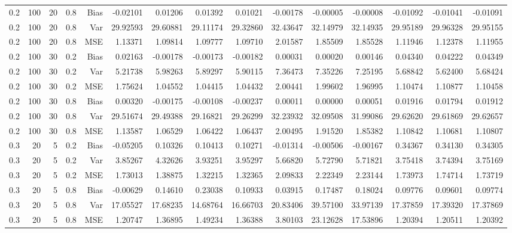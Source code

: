 \begin{table}[!htbp]
\begin{tabular}{lrrrrrrrrrrrrrr}
0.2 & 100 & 20 & 0.8 & Bias & -0.02101 & 0.01206 & 0.01392 & 0.01021 & -0.00178 & -0.00005 & -0.00008 & -0.01092 & -0.01041 & -0.01091 \\
0.2 & 100 & 20 & 0.8 & Var & 29.92593 & 29.60881 & 29.11174 & 29.32860 & 32.43647 & 32.14979 & 32.14935 & 29.95189 & 29.96328 & 29.95155 \\
0.2 & 100 & 20 & 0.8 & MSE & 1.13371 & 1.09814 & 1.09777 & 1.09710 & 2.01587 & 1.85509 & 1.85528 & 1.11946 & 1.12378 & 1.11955 \\
0.2 & 100 & 30 & 0.2 & Bias & 0.02163 & -0.00178 & -0.00173 & -0.00182 & 0.00031 & 0.00020 & 0.00146 & 0.04340 & 0.04222 & 0.04349 \\
0.2 & 100 & 30 & 0.2 & Var & 5.21738 & 5.98263 & 5.89297 & 5.90115 & 7.36473 & 7.35226 & 7.25195 & 5.68842 & 5.62400 & 5.68424 \\
0.2 & 100 & 30 & 0.2 & MSE & 1.75624 & 1.04552 & 1.04415 & 1.04432 & 2.00441 & 1.99602 & 1.96995 & 1.10474 & 1.10877 & 1.10458 \\
0.2 & 100 & 30 & 0.8 & Bias & 0.00320 & -0.00175 & -0.00108 & -0.00237 & 0.00011 & 0.00000 & 0.00051 & 0.01916 & 0.01794 & 0.01912 \\
0.2 & 100 & 30 & 0.8 & Var & 29.51674 & 29.49388 & 29.16821 & 29.26299 & 32.23932 & 32.09508 & 31.99086 & 29.62620 & 29.61869 & 29.62657 \\
0.2 & 100 & 30 & 0.8 & MSE & 1.13587 & 1.06529 & 1.06422 & 1.06437 & 2.00495 & 1.91520 & 1.85382 & 1.10842 & 1.10681 & 1.10807 \\
0.3 &  20 &  5 & 0.2 & Bias & -0.05205 & 0.10326 & 0.10413 & 0.10271 & -0.01314 & -0.00506 & -0.00167 & 0.34367 & 0.34130 & 0.34305 \\
0.3 &  20 &  5 & 0.2 & Var & 3.85267 & 4.32626 & 3.93251 & 3.95297 & 5.66820 & 5.72790 & 5.71821 & 3.75418 & 3.74394 & 3.75169 \\
0.3 &  20 &  5 & 0.2 & MSE & 1.73013 & 1.38875 & 1.32215 & 1.32365 & 2.09833 & 2.22349 & 2.23144 & 1.73973 & 1.74714 & 1.73719 \\
0.3 &  20 &  5 & 0.8 & Bias & -0.00629 & 0.14610 & 0.23038 & 0.10933 & 0.03915 & 0.17487 & 0.18024 & 0.09776 & 0.09601 & 0.09774 \\
0.3 &  20 &  5 & 0.8 & Var & 17.05527 & 17.68235 & 14.68764 & 16.66703 & 20.83406 & 39.57100 & 33.97139 & 17.37859 & 17.39320 & 17.37869 \\
0.3 &  20 &  5 & 0.8 & MSE & 1.20747 & 1.36895 & 1.49234 & 1.36388 & 3.80103 & 23.12628 & 17.53896 & 1.20394 & 1.20511 & 1.20392 \\

\end{tabular}
\end{table}
